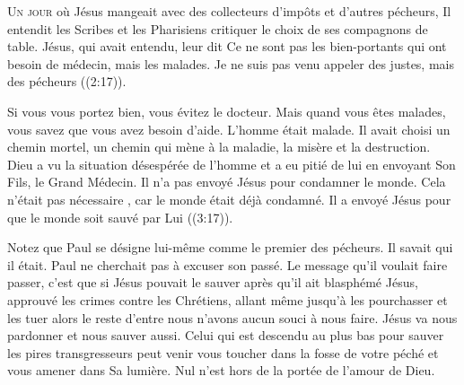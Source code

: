 



\lettrine{U}{n jour} où Jésus mangeait avec des collecteurs d'impôts
 et d'autres pécheurs, Il entendit les Scribes et les Pharisiens
 critiquer le choix de ses compagnons de table.
 \Og Jésus, qui avait entendu, leur dit\frcolon{}
 Ce ne sont pas les bien-portants qui ont besoin de médecin,
 mais les malades. Je ne suis pas venu appeler des justes,
 mais des pécheurs \Fg{} 
 ((2:17)).


Si vous vous portez bien, vous évitez le docteur.
 Mais quand vous êtes malades, vous savez que vous avez besoin d'aide.
 L'homme était malade. Il avait choisi un chemin mortel,
 un chemin qui mène à la maladie, la misère et la destruction.
 Dieu a vu la situation désespérée de l'homme et a eu pitié de lui
 en envoyant Son Fils, le Grand Médecin.
 Il n'a pas envoyé Jésus pour condamner le monde.
 Cela n'était pas nécessaire ,
 car le monde était déjà condamné. Il a envoyé Jésus
 \Og pour que le monde soit sauvé par Lui \Fg{} 
 ((3:17)).

Notez que Paul se désigne lui-même comme le premier des pécheurs.
 Il savait qui il était. Paul ne cherchait pas à excuser son passé.
 Le message qu'il voulait faire passer, c'est que si Jésus pouvait le sauver
 \ocadr après qu'il ait blasphémé Jésus, approuvé les crimes
 contre les Chrétiens, allant même jusqu'à les pourchasser
 et les tuer \fcadr{} alors le reste d'entre nous n'avons aucun souci
 à nous faire. Jésus va nous pardonner et nous sauver aussi.
 Celui qui est descendu au plus bas pour sauver les pires transgresseurs
 peut venir vous toucher dans la fosse de votre péché
 et vous amener dans Sa lumière.
 Nul n'est hors de la portée de l'amour de Dieu.

\dvrule



